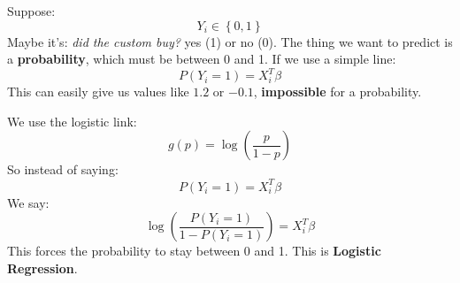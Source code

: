 \begin{examplebox}
    Suppose:
    \begin{equation*}
        Y_i \in \left\{0, 1\right\}
    \end{equation*}
    Maybe it's: \emph{did the custom buy?} yes (1) or no (0). The thing we want to predict is a \textbf{probability}, which must be between 0 and 1. If we use a simple line:
    \begin{equation*}
        P(Y_i = 1) = X_i^T \beta
    \end{equation*}
    This can easily give us values like $1.2$ or $-0.1$, \textbf{impossible} for a probability.

    \highspace
    We use the logistic link:
    \begin{equation*}
        g(p) = \log \left( \dfrac{p}{1-p} \right)
    \end{equation*}
    So instead of saying:
    \begin{equation*}
        P(Y_i = 1) = X_i^T \beta
    \end{equation*}
    We say:
    \begin{equation*}
        \log \left( \frac{P(Y_i = 1)}{1 - P(Y_i = 1)} \right) = X_i^T \beta
    \end{equation*}
    This forces the probability to stay between 0 and 1. This is \textbf{Logistic Regression}.
\end{examplebox}